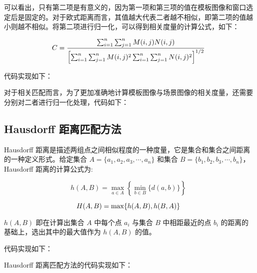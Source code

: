 可以看出，只有第二项是有意义的，因为第一项和第三项的值在模板图像和窗口选定后是固定的。对于欧式距离而言，其值越大代表二者越不相似，即第二项的值越小则越不相似。将第二项进行归一化，可以得到相关度量的计算公式，如下：

\begin{equation}
C=\frac{\sum_{i=1}^n \sum_{j=1}^n M(i, j) N(i, j)}{\left[\sum_{i=1}^n \sum_{j=1}^n M(i, j)^2 \sum_{i=1}^n \sum_{j=1}^n N(i, j)^2\right]^{1 / 2}}
\vspace{0.5cm}
\end{equation}

代码实现如下：

\vspace{0.3cm}


对于相关匹配而言，为了更加准确地计算模板图像与场景图像的相关度量，还需要分别对二者进行归一化处理，代码如下：

\vspace{0.3cm}


\subsection{Hausdorff 距离匹配方法}

Hausdorff 距离是描述两组点之间相似程度的一种度量，它是集合和集合之间距离的一种定义形式。给定集合 $A=\{a_1,a_2,a_3,\cdots,a_n\}$ 和集合 $B=\{b_1,b_2,b_3,\cdots,b_n\}$，Hausdorff 距离的计算公式为:

\begin{equation}
h(A, B)=\max _{a \in A}\left\{\min _{b \in B}\{d(a, b)\}\right\}
\end{equation}

\begin{equation}
H(A, B)=\max \{h(A, B), h(B, A)\}
\vspace{0.5cm}
\end{equation}

$h(A, B)$ 即在计算出集合 $A$ 中每个点 $a_i$ 与集合 $B$ 中相距最近的点 $b_i$ 的距离的基础上，选出其中的最大值作为 $h(A, B)$ 的值。

代码实现如下：

\vspace{0.3cm}


Hausdorff 距离匹配方法的代码实现如下：

\vspace{0.3cm}


